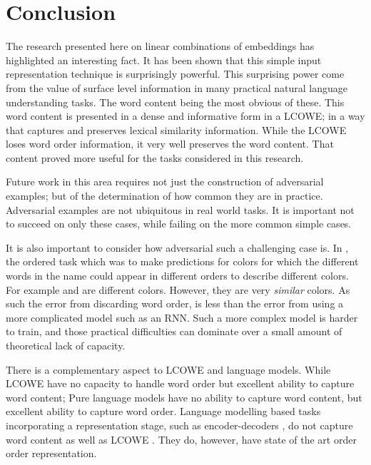 \documentclass{book}
\begin{document}
	
\chapter{Conclusion}
The research presented here on linear combinations of embeddings has highlighted an interesting fact.
It has been shown that this simple input representation technique is surprisingly powerful.
This surprising power come from the value of surface level information in many practical natural language understanding tasks.
The word content being the most obvious of these.
This word content is presented in a dense and informative form in a LCOWE; in a way that captures and preserves lexical similarity information.
While the LCOWE loses word order information, it very well preserves the word content.
That content proved more useful for the tasks considered in this research.


Future work in this area requires not just the construction of adversarial examples; but of the determination of how common they are in practice.
Adversarial examples are not ubiquitous in real world tasks.
It is important not to succeed on only these cases, while failing on the more common simple cases.

It is also important to consider how adversarial such a challenging case is.
In , the ordered task which was to make predictions for colors for which the different words in the name could appear in different orders to describe different colors.
For example  and  are different colors.
However, they are very \emph{similar} colors.
As such the error from discarding word order, is less than the error from using a more complicated model such as an RNN.
Such a more complex model is harder to train, and those practical difficulties can dominate over a small amount of theoretical lack of capacity.


There is a complementary aspect to LCOWE and language models.
While LCOWE have no capacity to handle word order but excellent ability to capture word content;
Pure language models have no ability to capture word content, but excellent ability to capture word order.
Language modelling based tasks incorporating a representation stage, such as encoder-decoders \citep{cho-EtAl:2014:EMNLP2014}, do not capture word content as well as LCOWE \citep{ac2018probingsentencevectors}.
They do, however, have state of the art order order representation.
\end{document}
